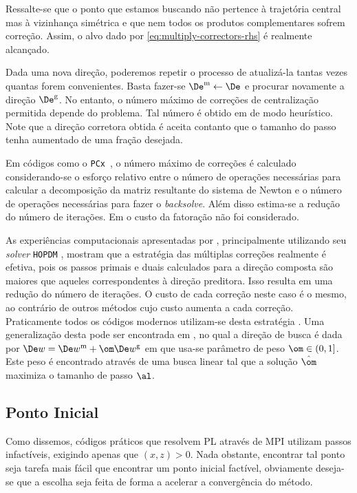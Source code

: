 Ressalte-se que o ponto que estamos buscando não pertence à trajetória central
mas à vizinhança simétrica e que nem todos os produtos complementares sofrem
correção. Assim, o alvo dado por \eqref{eq:multiply-correctors-rhs} é
realmente alcançado. 

Dada uma nova direção, poderemos repetir o processo de atualizá-la tantas vezes
quantas forem convenientes. Basta fazer-se $\DeMe  \leftarrow \De$ e procurar
novamente a direção $\DeMu$. No entanto, o número máximo de correções de
centralização permitida depende do problema. Tal número é obtido em
\cite{Gondzio:1996uw} de modo heurístico. Note que a direção corretora
obtida é aceita contanto que o tamanho do passo tenha aumentado de uma fração
desejada.


Em códigos como o \texttt{PCx}~\cite{Czyzyk:1999hk}, o
número máximo de correções é calculado considerando-se o esforço relativo entre o
número de operações necessárias para calcular a decomposição da matriz
resultante do sistema de Newton e o número de operações necessárias para fazer o
\emph{backsolve}. Além disso estima-se a redução do número de iterações. Em
\cite{Gondzio:1996uw}  o custo da fatoração não foi
considerado. 
    

As experiências computacionais apresentadas por \citeauthor{Gondzio:1996uw}, principalmente utilizando seu \emph{solver} \texttt{HOPDM} \cite{Gondzio:1995kv,Gondzio:1996uw},   mostram
que a estratégia das múltiplas correções realmente é efetiva, pois os passos
primais e duais calculados para a direção composta são maiores que aqueles
correspondentes à direção preditora.
Isso resulta em uma redução do número de iterações. O custo de cada
correção neste caso é o mesmo, ao contrário de outros métodos cujo custo aumenta a cada
correção. Praticamente todos os códigos modernos utilizam-se desta estratégia
\cite[Apêndice B]{Wright:Primal-dual-interior-point:1997h}. Uma generalização
desta pode ser encontrada em \cite{Colombo:2008ia}, no qual a direção de
busca é dada por $\Dew = \DeMew + \om\DeMuw$ em que usa-se parâmetro de peso
$\om\in(0,1]$. Este peso é encontrado através de uma busca linear tal que
a solução $\hat{\om}$  maximiza o tamanho de passo $\al$.



\subsection{Ponto Inicial}\label{subsec:initial-point}

Como dissemos, códigos práticos que resolvem \ac{PL} através de \ac{MPI}
utilizam passos infactíveis, exigindo apenas que $(x,z)>0$. Nada
obstante, encontrar tal ponto seja tarefa mais fácil que encontrar
um ponto inicial factível, obviamente deseja-se que a escolha seja feita de forma a
acelerar a convergência do método. 

